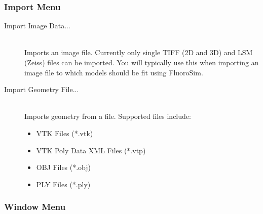 \documentclass[11pt]{article}
\begin{document}
\subsubsection{Import Menu}

\begin{description}

  \item[Import Image Data...] \hfill \\
  Imports an image file. Currently only single TIFF (2D and 3D) and LSM (Zeiss) files can be imported. You will typically use this when importing an image file to which models should be fit using FluoroSim.
  
  \item[Import Geometry File...] \hfill \\
  Imports geometry from a file. Supported files include:
  
  \begin{itemize}
  \item VTK Files (*.vtk)
  \item VTK Poly Data XML Files (*.vtp)
  \item OBJ Files (*.obj)
  \item PLY Files (*.ply)
  \end{itemize}

\end{description}

\subsubsection{Window Menu}
\end{document}
